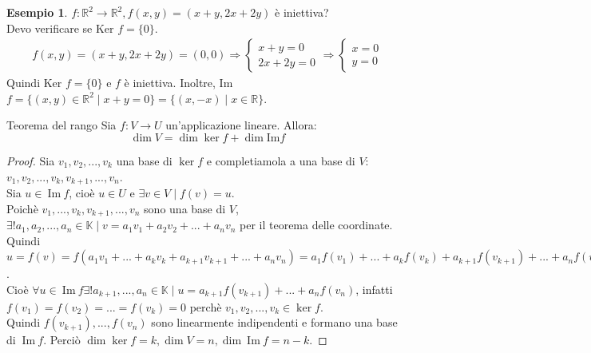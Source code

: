 \documentclass[a4paper]{article}
\newcommand{\IM}{\ \mathrm{Im} \ }
\theoremstyle{definition}
\newtheorem*{es}{Esempio}
\begin{document}
\begin{es}
	$f: \mathbb{R}^2 \rightarrow \mathbb{R}^2, f(x, y) = (x + y, 2x + 2y)$ è iniettiva? \\
	Devo verificare se Ker $f = \{0\}$.
	\begin{align*}
		f(x, y) = (x + y, 2x + 2y) = (0, 0) \Rightarrow \begin{cases}
			                                                x + y = 0 \\
			                                                2x + 2y = 0
		                                                \end{cases}
		\Rightarrow \begin{cases}
			            x = 0 \\
			            y = 0
		            \end{cases}
	\end{align*}
	Quindi Ker $f = \{0\}$ e $f$ è iniettiva.
	Inoltre, Im $f = \{(x, y) \in \mathbb{R}^2 \mid x + y = 0\} = \{(x, -x) \mid x \in \mathbb{R}\}$.
\end{es}

\begin{teo}{Teorema del rango}{}
	Sia $f: V \rightarrow U$ un'applicazione lineare. Allora:
	\begin{equation*}
		\dim V = \dim \ker f + \dim \text{Im} f
	\end{equation*}
\end{teo}
\begin{proof}
	Sia $v_1, v_2, ..., v_k$ una base di $\ker f$ e completiamola a una base di $V$: \\
	$v_1, v_2, ..., v_k, v_{k+1}, ..., v_n$. \\
	Sia $u \in \IM f$, cioè $u \in U$ e $\exists v \in V \mid f(v) = u$. \\
	Poichè $v_1, ..., v_k, v_{k + 1}, ..., v_n$ sono una base di $V$, $\exists! a_1, a_2, ..., a_n \in \mathbb{K} \mid v = a_1v_1 + a_2v_2 + ... + a_nv_n$ per il teorema delle coordinate. \\
	Quindi $u = f(v) = f(a_1v_1 + ... + a_kv_k + a_{k + 1}v_{k + 1} + ... + a_nv_n) = a_1f(v_1) + ... + a_kf(v_k) + a_{k + 1}f(v_{k + 1}) + ... + a_nf(v_n)$. \\
	Cioè $\forall u \in \IM f \exists! a_{k + 1}, ..., a_n \in \mathbb{K} \mid u = a_{k + 1}f(v_{k + 1}) + ... + a_nf(v_n)$,
	infatti $f(v_1) = f(v_2) = ... = f(v_k) = 0$ perchè $v_1, v_2, ..., v_k \in \ker f$. \\
	Quindi $f(v_{k + 1}), ..., f(v_n)$ sono linearmente indipendenti e formano una base di $\IM f$.
	Perciò $\dim \ker f = k, \dim V = n, \dim \IM f = n - k$.
\end{proof}
\end{document}
